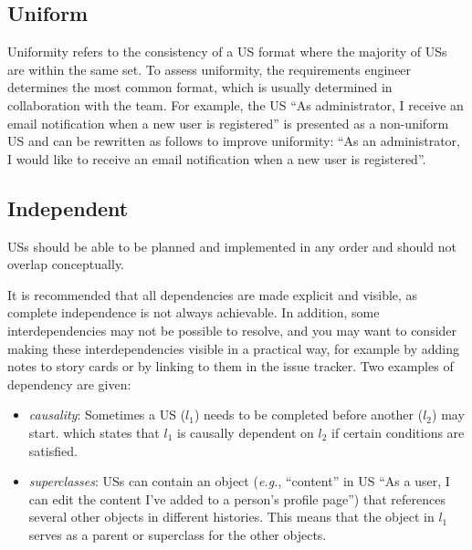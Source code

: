 \subsection*{\normalsize{Uniform}}
Uniformity refers to the consistency of a US format where the majority of USs are within the same set. To assess uniformity, the requirements engineer determines the most common format, which is usually determined in collaboration with the team. For example, the US \enquote{As administrator, I receive an email notification when a new user is registered} is presented as a non-uniform US and can be rewritten as follows to improve uniformity: \enquote{As an administrator, I would like to receive an email notification when a new user is registered}.
\subsection*{\normalsize{Independent}}
USs should be able to be planned and implemented in any order and should not overlap conceptually. 

It is recommended that all dependencies are made explicit and visible, as complete independence is not always achievable. In addition, some interdependencies may not be possible to resolve, and you may want to consider making these interdependencies visible in a practical way, for example by adding notes to story cards or by linking to them in the issue tracker. Two examples of dependency are given:
\begin{itemize}
\item\emph{causality}: Sometimes a US ($l_1$) needs to be completed before another ($l_2$) may start. which states that $l_1$ is causally dependent on $l_2$ if certain conditions are satisfied.
\item\emph{superclasses}: USs can contain an object (\emph{e.g.}, \enquote{content} in US \enquote{As a user, I can edit the content I've added to a person's profile page}) that references several other objects in different histories. This means that the object in $l_1$ serves as a parent or superclass for the other objects.
\end{itemize}
